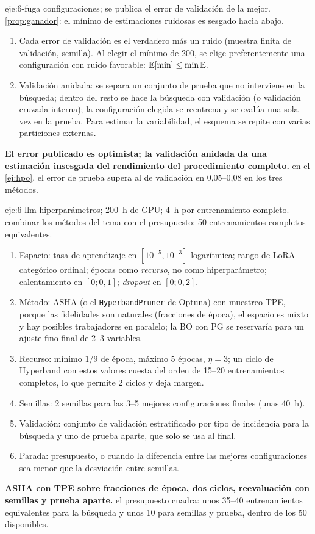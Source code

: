 \begin{solucion}{eje:6-fuga}
 configuraciones; se publica el error de validación de la mejor.
\planteamiento \cref{prop:ganador}: el mínimo de estimaciones ruidosas es sesgado hacia abajo.
\pasos
\begin{enumerate}[label=\arabic*.]
  \item Cada error de validación es el verdadero más un ruido (muestra finita de validación, semilla). Al elegir el mínimo de 200, se elige preferentemente una configuración con ruido favorable: $\mathbb{E}[\min]\le\min\mathbb{E}$.
  \item Validación anidada: se separa un conjunto de prueba que no interviene en la búsqueda; dentro del resto se hace la búsqueda con validación (o validación cruzada interna); la configuración elegida se reentrena y se evalúa una sola vez en la prueba. Para estimar la variabilidad, el esquema se repite con varias particiones externas.
\end{enumerate}
\resultado \textbf{El error publicado es optimista; la validación anidada da una estimación insesgada del rendimiento del procedimiento completo.}
\comprobacion en el \cref{ej:hpo}, el error de prueba supera al de validación en 0,05–0,08 en los tres métodos.
\end{solucion}

\begin{solucion}{eje:6-llm}
 hiperparámetros; 200~h de GPU; 4~h por entrenamiento completo.
\planteamiento combinar los métodos del tema con el presupuesto: 50 entrenamientos completos equivalentes.
\pasos
\begin{enumerate}[label=\arabic*.]
  \item Espacio: tasa de aprendizaje en $[10^{-5},10^{-3}]$ logarítmica; rango de LoRA categórico ordinal; épocas como \emph{recurso}, no como hiperparámetro; calentamiento en $[0;0{,}1]$; \emph{dropout} en $[0;0{,}2]$.
  \item Método: ASHA (o el \texttt{HyperbandPruner} de Optuna) con muestreo TPE, porque las fidelidades son naturales (fracciones de época), el espacio es mixto y hay posibles trabajadores en paralelo; la BO con PG se reservaría para un ajuste fino final de 2–3 variables.
  \item Recurso: mínimo $1/9$ de época, máximo 5 épocas, $\eta=3$; un ciclo de Hyperband con estos valores cuesta del orden de 15–20 entrenamientos completos, lo que permite 2 ciclos y deja margen.
  \item Semillas: 2 semillas para las 3–5 mejores configuraciones finales (unas 40~h).
  \item Validación: conjunto de validación estratificado por tipo de incidencia para la búsqueda y uno de prueba aparte, que solo se usa al final.
  \item Parada: presupuesto, o cuando la diferencia entre las mejores configuraciones sea menor que la desviación entre semillas.
\end{enumerate}
\resultado \textbf{ASHA con TPE sobre fracciones de época, dos ciclos, reevaluación con semillas y prueba aparte.}
\comprobacion el presupuesto cuadra: unos 35–40 entrenamientos equivalentes para la búsqueda y unos 10 para semillas y prueba, dentro de los 50 disponibles.
\end{solucion}
